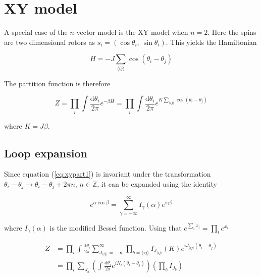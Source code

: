 \section{XY model}
\label{sec:XYModel}

A special case of the $n$-vector model is the XY model when $n = 2$. Here the spins are two dimensional rotors as $s_i = (\cos \theta_i, \  \sin \theta_i)$. This yields the Hamiltonian

\begin{equation}
    H = - J \sum_{\langle ij \rangle} \cos(\theta_i - \theta_j)
\end{equation}

The partition function is therefore

\begin{equation}
    Z = \prod_i \int \frac{\mathrm d \theta_i}{2 \pi} e^{-\beta H} = \prod_i \int \frac{\mathrm d \theta_i}{2 \pi} e^{K \sum_{\langle ij \rangle} \cos(\theta_i - \theta_j)}
\label{eq:xypart1}
\end{equation}

where $K = J \beta$.

\subsection{Loop expansion}
\label{subsec:XYLoopexp}

Since equation (\ref{eq:xypart1}) is invariant under the transformation $\theta_i - \theta_j \rightarrow \theta_i - \theta_j + 2 \pi n$, $n \in \mathbb{Z}$, it can be expanded using the identity

\begin{equation}
    e^{\alpha \cos \beta} = \sum_{\gamma = -\infty}^{\infty} I_\gamma ( \alpha ) e^{i \gamma \beta}
\end{equation}

where $I_\gamma(\alpha)$ is the modified Bessel function. Using that $e^{\sum_i x_i} = \prod_i e^{x_i}$

\begin{align}
    Z &= \prod_i \int \frac{\mathrm d \theta_i}{2 \pi} \sum_{J_{\langle ij \rangle} = -\infty}^{\infty} \prod_{b = \langle ij \rangle} I_{J_{\langle ij \rangle}} ( K ) e^{i J_{\langle ij \rangle} (\theta_i - \theta_j)} \\
\label{eq:xypart2}
% 
    &=  \prod_i \sum_{J_b} \left ( \int \frac{\mathrm d \theta_i}{2 \pi} e^{i N_i (\theta_i - \theta_j)} \right ) \left ( \prod_b I_{J_b} \right ) 
\end{align}

